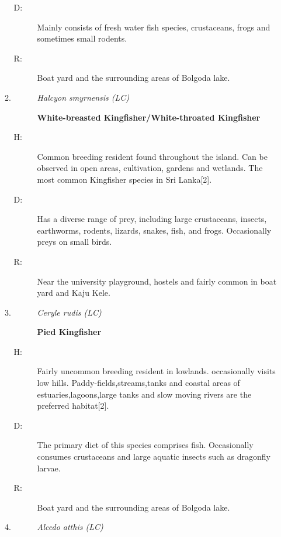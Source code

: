 \begin{itemize}
\begin{enumerate}
\begin{description}
\item[D: ]%
Mainly consists of fresh water fish species, crustaceans, frogs and sometimes small rodents.%
\item[R: ]%
Boat yard and the surrounding areas of Bolgoda lake.%
\end{description}%
\item%
\begin{description}%
\item[]%
\textit{Halcyon smyrnensis (LC)}%
\item[]%
\textbf{White{-}breasted Kingfisher/White{-}throated Kingfisher}%
\end{description}%
\begin{description}%
\item[H: ]%
Common breeding resident found throughout the island. Can be observed in open areas, cultivation, gardens and wetlands. The most common Kingfisher species in Sri Lanka{[}2{]}.%
\item[D: ]%
Has a diverse range of prey, including large crustaceans, insects, earthworms, rodents, lizards, snakes, fish, and frogs. Occasionally preys on small birds.%
\item[R: ]%
Near the university playground, hostels and fairly common in boat yard and Kaju Kele.%
\end{description}%
\item%
\begin{description}%
\item[]%
\textit{Ceryle rudis (LC)}%
\item[]%
\textbf{Pied Kingfisher}%
\end{description}%
\begin{description}%
\item[H: ]%
Fairly uncommon breeding resident in lowlands. occasionally visits low hills. Paddy-fields,streams,tanks and coastal areas of estuaries,lagoons,large tanks and slow moving rivers are the preferred habitat{[}2{]}.%
\item[D: ]%
The primary diet of this species comprises fish. Occasionally consumes crustaceans and large aquatic insects such as dragonfly larvae.%
\item[R: ]%
Boat yard and the surrounding areas of Bolgoda lake.%
\end{description}%
\item%
\begin{description}%
\item[]%
\textit{Alcedo atthis (LC)}%
\item[]%

\end{description}
\end{enumerate}
\end{itemize}

